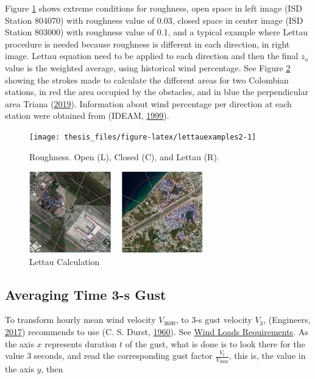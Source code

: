 \documentclass[12pt,oneside]{reedthesis}
\begin{document}
Figure \ref{fig:lettauexamples2} shows extreme conditions for roughness, open space in left image (ISD Station 804070) with roughness value of 0.03, closed space in center image (ISD Station 803000) with roughness value of 0.1, and a typical example where Lettau procedure is needed because roughness is different in each direction, in right image. Lettau equation need to be applied to each direction and then the final \(z_o\) value is the weighted average, using historical wind percentage. See Figure \ref{fig:lettauvalues} showing the strokes made to calculate the different areas for two Colombian stations, in red the area occupied by the obstacles, and in blue the perpendicular area Triana (\protect\hyperlink{ref-triana2019}{2019}). Information about wind percentage per direction at each station were obtained from (IDEAM, \protect\hyperlink{ref-ideam1999}{1999}).
\begin{figure}

{\centering \texttt{[image: thesis\_files/figure-latex/lettauexamples2-1]} 

}

\caption{Roughness. Open (L), Closed (C), and Lettau (R).}\label{fig:lettauexamples2}
\end{figure}
\begin{figure}

{\centering \includegraphics[width=2.97in]{figure/lettauvalues} 

}

\caption{Lettau Calculation}\label{fig:lettauvalues}
\end{figure}
\hypertarget{rmd-gust}{%
\subsection{Averaging Time 3-s Gust}\label{rmd-gust}}

To transform hourly mean wind velocity \(V_{3600}\), to 3-s gust velocity \(V_3\), (Engineers, \protect\hyperlink{ref-Asce2017}{2017}) recommends to use (C. S. Durst, \protect\hyperlink{ref-Durst1960}{1960}). See \protect\hyperlink{windloadsrequirements}{Wind Loads Requirements}. As the axis \(x\) represents duration \(t\) of the gust, what is done is to look there for the value 3 seconds, and read the corresponding gust factor \(\frac{V_t}{V_{3600}}\), this is, the value in the axis \(y\), then
\end{document}
